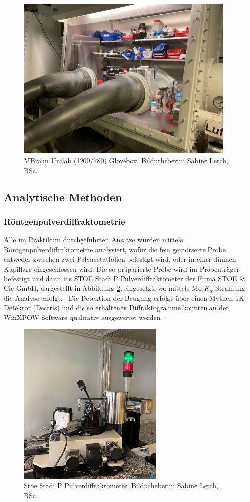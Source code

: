 \documentclass[12pt]{article}
\begin{document}
\begin{figure}[H]
    \centering
    \includegraphics[height=8cm]{Images/Glovebox.jpg}
    \caption{MBraun Unilab (1200/780) Glovebox. Bildurheberin: Sabine Lerch, BSc.}
    \label{fig:glovebox}
\end{figure}

\subsection{Analytische Methoden}
\subsubsection{Röntgenpulverdiffraktometrie}
Alle im Praktikum durchgeführten Ansätze wurden mittels Röntgenpulverdiffraktometrie analysiert, wofür die fein gemörserte Probe entweder zwischen zwei Polyacetatfolien befestigt wird, oder in einer dünnen Kapillare eingeschlossen wird.
Die so präparierte Probe wird im Probenträger befestigt und dann ins STOE Stadi P Pulverdiffraktometer der Firma STOE \& Cie GmbH, dargestellt in Abbildung \ref{fig:stoe},  eingesetzt, wo mittels Mo-$K_{\alpha}$-Strahlung die Analyse erfolgt.~\cite{StoeP}
Die Detektion der Beugung erfolgt über einen Mythen 1K-Detektor (Dectris) und die so erhaltenen Diffraktogramme konnten an der WinXPOW Software qualitativ ausgewertet werden~\cite{Stoe}.

\begin{figure}[H]
    \centering
    \includegraphics[height=8cm]{Images/Pulverdiff.jpg}
    \caption{Stoe Stadi P Pulverdiffraktometer. Bildurheberin: Sabine Lerch, BSc.}
    \label{fig:stoe}
\end{figure}
\end{document}
